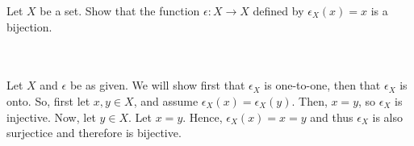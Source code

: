 Let $X$ be a set. Show that the function $\epsilon:X\rightarrow X$ defined by $\epsilon_X(x)=x$ is a
bijection.\\\\

\begin{solution}\renewcommand{\qedsymbol}{}\ \\
    Let $X$ and $\epsilon$ be as given. We will show first that $\epsilon_X$ is one-to-one, then that
    $\epsilon_X$ is onto. So, first let $x,y\in X$, and assume $\epsilon_X(x)=\epsilon_X(y)$. Then,
    $x=y$, so $\epsilon_X$ is injective. Now, let $y\in X$. Let $x=y$. Hence, $\epsilon_X(x)=x=y$ and
    thus $\epsilon_X$ is also surjectice and therefore is bijective.

\end{solution}